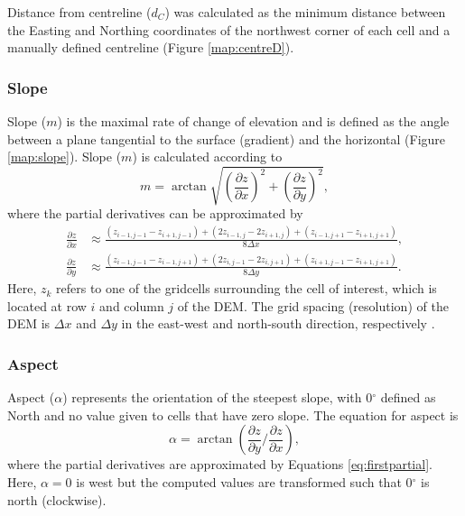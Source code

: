 \documentclass{sfuthesis}
\begin{document}
Distance from centreline ($d_C$) was calculated as the minimum distance between the Easting and Northing coordinates of the northwest corner of each cell and a manually defined centreline (Figure \ref{map:centreD}). 


\subsubsection*{Slope} 

Slope ($m$) is the maximal rate of change of elevation and is defined as the angle between a plane tangential to the surface (gradient) and the horizontal \citep{Olaya2009} (Figure \ref{map:slope}). Slope ($m$) is calculated according to 
\begin{equation}
m = \arctan \sqrt{\left( \frac{\partial z}{\partial x} \right) ^2 + \left( \frac{\partial z}{\partial y} \right) ^2},
\end{equation}
where the partial derivatives can be approximated by \citep{Mitavsova1993, Neteler2008, Hofierka2009}
\begin{align} \label{eq:firstpartial}
\frac{\partial z}{\partial x} &\approx \frac{(z_{i-1,j-1}-z_{i+1,j-1})+(2z_{i-1,j}-2z_{i+1,j})+(z_{i-1,j+1}-z_{i+1,j+1})}{8  \Delta x},\nonumber \\
\frac{\partial z}{\partial y} &\approx \frac{(z_{i-1,j-1}-z_{i-1,j+1})+(2z_{i,j-1}-2z_{i,j+1})+(z_{i+1,j-1}-z_{i+1,j+1})}{8  \Delta y}.
\end{align}
Here, $z_k$ refers to one of the gridcells surrounding the cell of interest, which is located at row $i$ and column $j$ of the DEM. The grid spacing (resolution) of the DEM is $\Delta x$ and $\Delta y$ in the east-west and north-south direction, respectively \citep{Neteler2008}. 

\subsubsection*{Aspect} 

Aspect ($\alpha$) represents the orientation of the steepest slope, with 0${^\circ}$ defined as North and no value given to cells that have zero slope. The equation for aspect is \citep{Neteler2008}
	\begin{equation}
	\alpha = \arctan\left(\frac{\partial z}{\partial y} \bigg/ \frac{\partial z}{\partial x}\right), 
	\end{equation}
where the partial derivatives are approximated by Equations \ref{eq:firstpartial}. Here, $\alpha = 0$ is west but the computed values are transformed such that 0${^\circ}$ is north (clockwise). 
\end{document}
